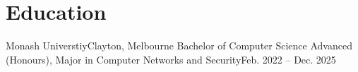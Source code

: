 \section{Education}
\resumeSubHeadingListStart
\resumeSubheading
{Monash Universtiy}{Clayton, Melbourne}
{Bachelor of Computer Science Advanced (Honours), Major in Computer Networks and Security}{Feb. 2022 -- Dec. 2025}
\resumeItemListStart
\setlength\itemsep{0px}
\resumeItemListEnd
\resumeSubHeadingListEnd
